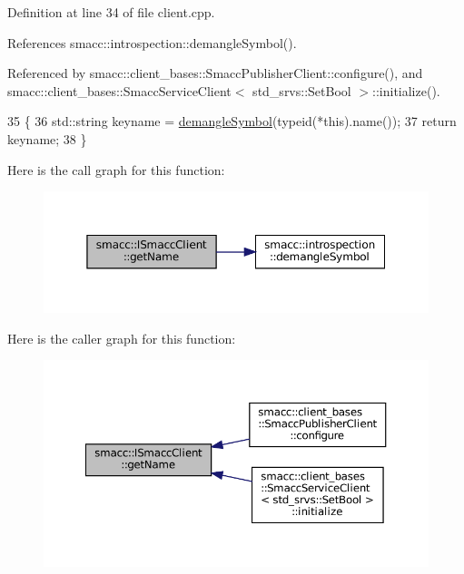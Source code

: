 Definition at line 34 of file client.\+cpp.



References smacc\+::introspection\+::demangle\+Symbol().



Referenced by smacc\+::client\+\_\+bases\+::\+Smacc\+Publisher\+Client\+::configure(), and smacc\+::client\+\_\+bases\+::\+Smacc\+Service\+Client$<$ std\+\_\+srvs\+::\+Set\+Bool $>$\+::initialize().


\begin{DoxyCode}
35 \{
36     std::string keyname = \hyperlink{namespacesmacc_1_1introspection_a2f495108db3e57604d8d3ff5ef030302}{demangleSymbol}(\textcolor{keyword}{typeid}(*this).name());
37     \textcolor{keywordflow}{return} keyname;
38 \}
\end{DoxyCode}
Here is the call graph for this function\+:
\nopagebreak
\begin{figure}[H]
\begin{center}
\leavevmode
\includegraphics[width=350pt]{classsmacc_1_1ISmaccClient_a8c3ce19f182e71909c5dc6263d25be69_cgraph}
\end{center}
\end{figure}
Here is the caller graph for this function\+:
\nopagebreak
\begin{figure}[H]
\begin{center}
\leavevmode
\includegraphics[width=350pt]{classsmacc_1_1ISmaccClient_a8c3ce19f182e71909c5dc6263d25be69_icgraph}
\end{center}
\end{figure}
\mbox{\label{classsmacc_1_1ISmaccClient_aec51d4712404cb9882b86e4c854bb93a}} 
